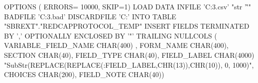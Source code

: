 OPTIONS ( ERRORS= 10000, SKIP=1)
LOAD DATA
INFILE 'C:\meta\REDCAP\instrument3.csv' "str '\r'" 
BADFILE 'C:\meta\RedCap\instrument3.bad'
DISCARDFILE 'C:\meta\RedCap{}' 
INTO TABLE "SBREXT"."REDCAPPROTOCOL_TEMP"
INSERT
FIELDS TERMINATED BY ','
OPTIONALLY ENCLOSED BY '"'
TRAILING NULLCOLS                 
   (  VARIABLE_FIELD_NAME  CHAR(400) ,
    FORM_NAME CHAR(400), 
    SECTION CHAR(40), 
    FIELD_TYPE CHAR(40), 
    FIELD_LABEL CHAR(4000) "SubStr(REPLACE(REPLACE(:FIELD_LABEL,CHR(13)),CHR(10)), 0, 1000)",
    CHOICES CHAR(200), 
    FIELD_NOTE CHAR(40))